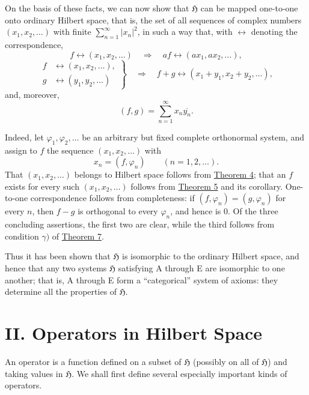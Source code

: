 ﻿\documentclass[paper=b5,fontsize=13pt,bookmarkpackage=false,twoside]{scrartcl}
\begin{document}
On the basis of these facts, we can now show that $\mathfrak H$ can be mapped one-to-one onto ordinary Hilbert space, that is, the set of all sequences of complex numbers $(x_1,x_2,\ldots)$ with finite $\sum_{n=1}^{\infty}|x_n|^2$, in such a way that, with $\longleftrightarrow$ denoting the correspondence,
\[
 f\longleftrightarrow(x_1,x_2,\ldots)
 \quad\Longrightarrow\quad
 af\longleftrightarrow(ax_1,ax_2,\ldots),
\]
\[
 \left.
\begin{aligned}
 f&\longleftrightarrow(x_1,x_2,\ldots),\\
 g&\longleftrightarrow(y_1,y_2,\ldots)
\end{aligned}
\right\}
\quad\Longrightarrow\quad
 f+g\longleftrightarrow(x_1+y_1,x_2+y_2,\ldots),
\]
and, moreover,
\[
 (f,g)=\sum_{n=1}^{\infty}x_n\overline{y_n}.
\]

Indeed, let $\varphi_1,\varphi_2,\ldots$ be an arbitrary but fixed complete orthonormal system, and assign to $f$ the sequence $(x_1,x_2,\ldots)$ with
\[
 x_n=(f,\varphi_n)
 \qquad(n=1,2,\ldots).
\]
That $(x_1,x_2,\ldots)$ belongs to Hilbert space follows from \hyperref[thm:4]{Theorem 4}; that an $f$ exists for every such $(x_1,x_2,\ldots)$ follows from \hyperref[thm:5]{Theorem 5} and its corollary. One-to-one correspondence follows from completeness: if $(f,\varphi_n)=(g,\varphi_n)$ for every $n$, then $f-g$ is orthogonal to every $\varphi_n$, and hence is $0$. Of the three concluding assertions, the first two are clear, while the third follows from condition $\gamma)$ of \hyperref[thm:7]{Theorem 7}.

Thus it has been shown that $\mathfrak H$ is isomorphic to the ordinary Hilbert space, and hence that any two systems $\mathfrak H$ satisfying A through E are isomorphic to one another; that is, A through E form a ``categorical'' system of axioms: they determine all the properties of $\mathfrak H$.

\section*{II. Operators in Hilbert Space}\label{chap:II}

An operator is a function defined on a subset of $\mathfrak H$ (possibly on all of $\mathfrak H$) and taking values in $\mathfrak H$. We shall first define several especially important kinds of operators.
\end{document}
